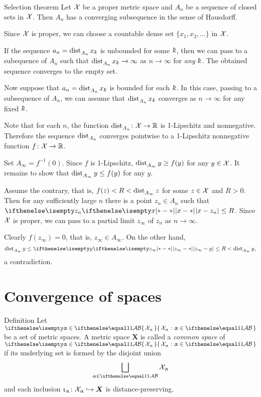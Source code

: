 \begin{thm}{Selection theorem}
Let $\mathcal{X}$ be a proper metric  space
and $A_n$ be a sequence of closed sets in $\mathcal{X}$.
Then  $A_n$ has a converging subsequence in the sense of Hausdorff.
\end{thm}

Since $\mathcal{X}$ is proper,
we can choose a countable dense set $\{x_1,x_2, \dots\}$ in $\mathcal{X}$.

If the sequence $a_n=\distfun{A_n}x_\kay$ is unbounded for some $\kay$,
then we can pass to a subequence of $A_n$ such that 
$\distfun{A_n}x_\kay\to \infty$ as $n\to\infty$ for \emph{any} $\kay$.
The obtained sequence converges to the empty set.

Now suppose that $a_n=\distfun{A_n}x_\kay$ is bounded for each $\kay$. 
In this case, passing to a subsequence of $A_n$,
we can assume that $\distfun{A_n}x_\kay$ converges as $n\to\infty$ for any fixed $\kay$.

Note that for each $n$, the function $\distfun{A_n}\:\spc{X}\to\RR$ is 1-Lipschitz and nonnegative.
Therefore the sequence $\mathop{\rm dist}\nolimits_{A_n}^{{}}$ converges pointwise to a 1-Lipschitz nonnegative function $f\:\spc{X}\to\RR$.

Set $A_\infty=f^{-1}(0)$.
Since $f$ is 1-Lipschitz, 
$\distfun{A_\infty}y\ge f(y)$ for any $y\in \spc{X}$.
It remains to show that $\distfun{A_\infty}y\le f(y)$ for any $y$.

Assume the  contrary,
that is, $f(z)<R<\mathop{\rm dist}\nolimits_{A_\infty}^{{}}z$ for some $z\in \spc{X}$ and $R>0$.
Then for any sufficiently large $n$ there is a point $z_n\in A_n$ such that
$\dist{x}{z_n}{}\le R$.
Since $\mathcal{X}$ is proper, we can pass to a partial limit $z_\infty$ of $z_n$ as $n\to\infty$.

Clearly  $f(z_\infty)=0$, that is, $z_\infty\in A_\infty$.
On the other hand, 
\[\distfun{A_\infty}y\le\dist{z_\infty}{y}{}\le R<\distfun{A_\infty}y,\] 
a contradiction.
\qeds

\section{Convergence of spaces}

\begin{thm}{Definition}\label{def:comp-metr}
Let $\set{\spc{X}_\alpha}{\alpha\in\IndexSet}$ be a set of metric spaces.
A metric space $\bm{X}$
is called a \emph{common space} of $\set{\spc{X}_\alpha}{\alpha\in\IndexSet}$ if its underlying set is formed by the disjoint union
$$\bigsqcup_{\alpha\in\IndexSet} \spc{X}_\alpha$$ 
and each inclusion $\iota_\alpha\:\spc{X}_\alpha\hookrightarrow\bm{X}$
is distance-preserving.
\end{thm}

